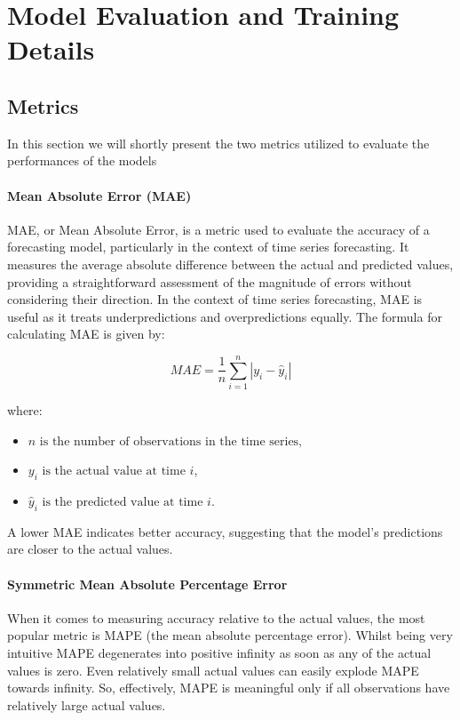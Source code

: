 \section{Model Evaluation and Training Details}

\subsection{Metrics}

In this section we will shortly present the two metrics utilized to evaluate the performances of the models

\paragraph{Mean Absolute Error (MAE)}
MAE, or Mean Absolute Error, is a metric used to evaluate the accuracy of a forecasting model, particularly in the context of time series forecasting. It measures the average absolute difference between the actual and predicted values, providing a straightforward assessment of the magnitude of errors without considering their direction. In the context of time series forecasting, MAE is useful as it treats underpredictions and overpredictions equally. The formula for calculating MAE is given by:

\[
MAE = \frac{1}{n} \sum_{i=1}^{n} |y_i - \hat{y}_i|
\]

where:
\begin{itemize}[noitemsep, leftmargin=*]
\item[] $n \text{ is the number of observations in the time series,}$
\item[] $y_i \text{ is the actual value at time } i$, 
\item[] $\hat{y}_i \text{ is the predicted value at time } i$.
\end{itemize}

A lower MAE indicates better accuracy, suggesting that the model's predictions are closer to the actual values.

\paragraph{Symmetric Mean Absolute Percentage Error}
When it comes to measuring accuracy relative to the actual values, the most
popular metric is MAPE (the mean absolute percentage error). Whilst being very intuitive MAPE degenerates into positive infinity as soon as any of the actual values is zero. Even relatively small actual values can easily explode MAPE towards infinity. So, effectively, MAPE is meaningful only if all observations have relatively large actual values. 

